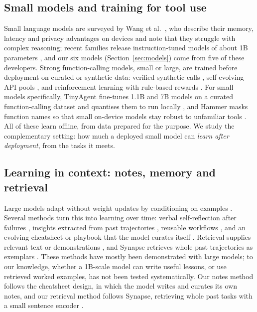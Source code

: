 \documentclass[a4paper,fleqn]{cas-dc}
\begin{document}
\subsection{Small models and training for tool use}\label{sec:rw-train}
Small language models are surveyed by Wang et al.~\citep{wang2025comprehensive}, who describe their memory, latency
and privacy advantages on devices and note that they struggle with complex reasoning; recent families release
instruction-tuned models of about 1B parameters
\citep{yang2025qwen3,grattafiori2024llama,meta2024llama32,gemmateam2025gemma,falconllmteam2024falcon,amini2025lfm2}, and
our six models (Section~\ref{sec:models}) come from five of these developers. Strong function-calling models, small or
large, are trained before deployment on curated or synthetic data: verified synthetic calls \citep{zhang2025xlam},
self-evolving API pools \citep{liu2025toolace}, and reinforcement learning with rule-based rewards
\citep{qian2025toolrl}. For small models specifically, TinyAgent fine-tunes 1.1B and 7B models on a curated
function-calling dataset and quantises them to run locally \citep{erdogan2024tinyagent}, and Hammer masks function names
so that small on-device models stay robust to unfamiliar tools \citep{lin2025robust}. All of these learn offline, from
data prepared for the purpose. We study the complementary setting: how much a deployed small model can \emph{learn after
deployment}, from the tasks it meets.

\subsection{Learning in context: notes, memory and retrieval}\label{sec:rw-context}
Large models adapt without weight updates by conditioning on examples \citep{brown2020language}. Several methods turn
this into learning over time: verbal self-reflection after failures \citep{shinn2023reflexion}, insights extracted from
past trajectories \citep{zhao2024expel}, reusable workflows \citep{wang2025agent}, and an evolving cheatsheet or
playbook that the model curates itself \citep{suzgun2026dynamic,zhang2026agentic}. Retrieval supplies relevant text
\citep{lewis2020retrieval} or demonstrations \citep{liu2022what}, and Synapse retrieves whole past trajectories as
exemplars \citep{zheng2024synapse}. These methods have mostly been demonstrated with large models; to our knowledge, whether a
1B-scale model can write useful lessons, or use retrieved worked examples, has not been tested systematically. Our notes method follows the
cheatsheet design, in which the model writes and curates its own notes, and our retrieval method follows Synapse,
retrieving whole past tasks with a small sentence encoder \citep{reimers2019sentence,wang2020minilm}.
\end{document}
